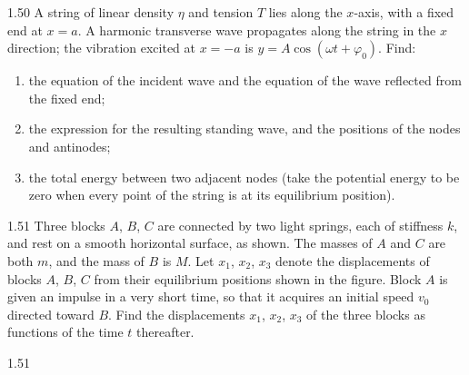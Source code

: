\begin{problem}{1.50}
A string of linear density $\eta$ and tension $T$ lies along the $x$-axis, with a fixed end at $x=a$. A harmonic transverse wave propagates along the string in the $x$ direction; the vibration excited at $x=-a$ is $y=A\cos(\omega t+\varphi_0)$. Find:
\begin{enumerate}[label=(\arabic*),leftmargin=2.2em,itemsep=1pt,topsep=2pt]
\item the equation of the incident wave and the equation of the wave reflected from the fixed end;
\item the expression for the resulting standing wave, and the positions of the nodes and antinodes;
\item the total energy between two adjacent nodes (take the potential energy to be zero when every point of the string is at its equilibrium position).
\end{enumerate}
\end{problem}

\begin{problem}{1.51}
Three blocks $A$, $B$, $C$ are connected by two light springs, each of stiffness $k$, and rest on a smooth horizontal surface, as shown. The masses of $A$ and $C$ are both $m$, and the mass of $B$ is $M$. Let $x_1$, $x_2$, $x_3$ denote the displacements of blocks $A$, $B$, $C$ from their equilibrium positions shown in the figure. Block $A$ is given an impulse in a very short time, so that it acquires an initial speed $v_0$ directed toward $B$. Find the displacements $x_1$, $x_2$, $x_3$ of the three blocks as functions of the time $t$ thereafter.
\end{problem}

\begin{figbox}{1.51}
\end{figbox}

